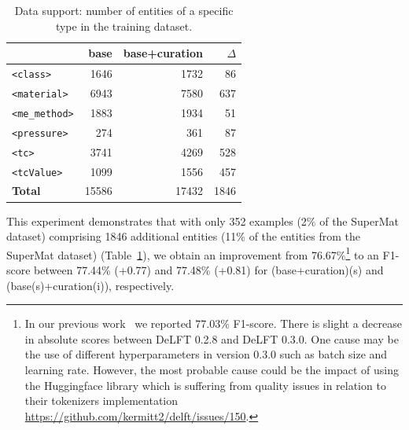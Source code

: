 \documentclass[a4paper]{article}
\begin{document}
\begin{table}[ht]
\centering
\caption{Data support: number of entities of a specific type in the training dataset.}
\begin{tabular}{lrrr}
\toprule
                        & \textbf{base}     & \textbf{base+curation}    & \textbf{$\Delta$}  \\ 
\midrule
\texttt{<class>}        & 1646              & 1732                      &  86                \\
\texttt{<material>}     & 6943              & 7580                      &  637               \\
\texttt{<me\_method>}   & 1883              & 1934                      &  51                \\
\texttt{<pressure>}     & 274               & 361                       &  87                \\
\texttt{<tc>}           & 3741              & 4269                      &  528               \\
\texttt{<tcValue>}      & 1099              & 1556                      &  457               \\
\midrule
\textbf{Total}          & 15586             & 17432                     & 1846               \\ 
\bottomrule
\end{tabular}
\label{tab:training-support}
\end{table}


This experiment demonstrates that with only 352 examples (2\% of the SuperMat dataset) comprising 1846 additional entities (11\% of the entities from the SuperMat dataset) (Table~\ref{tab:training-support}), we obtain an improvement from 76.67\%\footnote{In our previous work~\cite{lfoppiano2023automatic} we reported 77.03\% F1-score. 
There is slight a decrease in absolute scores between DeLFT 0.2.8 and DeLFT 0.3.0. 
One cause may be the use of different hyperparameters in version 0.3.0 such as batch size and learning rate.
However, the most probable cause could be the impact of using the Huggingface library which is suffering from quality issues in relation to their tokenizers implementation \url{https://github.com/kermitt2/delft/issues/150}.} to an F1-score between 77.44\% (+0.77) and 77.48\% (+0.81) for (base+curation)(s) and (base(s)+curation(i)), respectively. 

\end{document}
